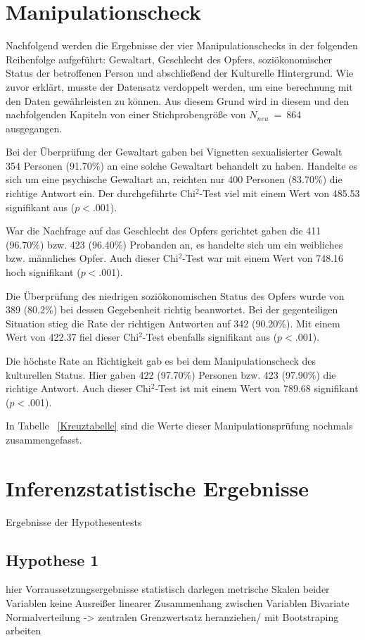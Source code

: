 \section{Manipulationscheck}    \label{sec_4.2}
Nachfolgend werden die Ergebnisse der vier Manipulationschecks in der folgenden Reihenfolge aufgeführt: Gewaltart, Geschlecht des Opfers, soziökonomischer Status der betroffenen Person und abschließend der Kulturelle Hintergrund.
Wie zuvor erklärt, musste der Datensatz verdoppelt werden, um eine berechnung mit den Daten gewährleisten zu können. Aus diesem Grund wird in diesem und den nachfolgenden Kapiteln von einer Stichprobengröße von $N_{neu}$~=~864 ausgegangen.

Bei der Überprüfung der Gewaltart gaben bei Vignetten sexualisierter Gewalt 354 Personen (91.70\%) an eine solche Gewaltart behandelt zu haben. Handelte es sich um eine psychische Gewaltart an, reichten nur 400 Personen (83.70\%) die richtige Antwort ein. Der durchgeführte Chi$^2$-Test viel mit einem Wert von 485.53 signifikant aus ($p<$.001). 

War die Nachfrage auf das Geschlecht des Opfers gerichtet gaben die 411 (96.70\%) bzw. 423 (96.40\%) Probanden an, es handelte sich um ein weibliches bzw. männliches Opfer. Auch dieser Chi$^2$-Test war mit einem Wert von 748.16 hoch signifikant ($p<$.001). 


Die Überprüfung des niedrigen soziökonomischen Status des Opfers wurde von 389 (80.2\%) bei dessen Gegebenheit richtig beanwortet. Bei der gegenteiligen Situation stieg die Rate der richtigen Antworten auf 342 (90.20\%). Mit einem Wert von 422.37 fiel dieser Chi$^2$-Test ebenfalls signifikant aus ($p<$.001). 

Die höchste Rate an Richtigkeit gab es bei dem Manipulationscheck des kulturellen Status. Hier gaben 422 (97.70\%) Personen bzw. 423 (97.90\%) die richtige Antwort. Auch dieser Chi$^2$-Test ist mit einem Wert von 789.68 signifikant ($p<$.001). 


In Tabelle ~\ref{Kreuztabelle} sind die Werte dieser Manipulationsprüfung nochmals zusammengefasst.


\section{Inferenzstatistische Ergebnisse}    \label{sec_4.3}
Ergebnisse der Hypothesentests


\subsection{Hypothese 1}    \label{subsec_4.3.1}
hier Vorraussetzungsergebnisse statistisch darlegen
metrische Skalen beider Variablen
keine Ausreißer
linearer Zusammenhang zwischen Variablen
Bivariate Normalverteilung -> zentralen Grenzwertsatz heranziehen/ mit Bootstraping arbeiten


